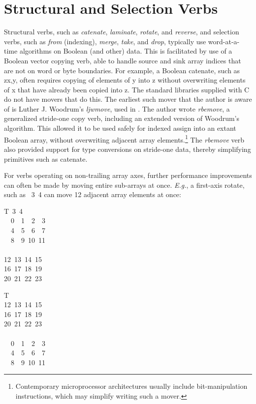 \section{Structural and Selection Verbs}

Structural verbs, such as {\em catenate}, {\em laminate}, 
{\em rotate}, and {\em reverse}, and selection verbs, such as
{\em from} (indexing), {\em merge}, {\em take}, and {\em drop},
typically use word-at-a-time algorithms on Boolean (and other) data.
This is facilitated by use of a Boolean vector copying verb,
able to handle source and sink array indices that are not 
on word or byte boundaries. 
For example, a Boolean catenate, such as {\apl z\qlarrow\0x,y},
often requires copying of elements of {\apl y} into {\apl z} 
without overwriting elements of {\apl x} that have already
been copied into {\apl z}. The standard libraries supplied with C
do not have movers that do this. The earliest such mover
that the author is aware of is Luther J. Woodrum's {\em ljwmove}, 
used in \ibmapl. The author wrote {\em rbemove}, a generalized stride-one
copy verb, including an extended version of 
Woodrum's algorithm. This allowed it to be used safely for
indexed assign into an extant Boolean array, without overwriting
adjacent array elements.\footnote{Contemporary microprocessor architectures 
usually include bit-manipulation instructions, which may simplify 
writing such a mover.} The {\em rbemove} verb also provided
support for type conversions on stride-one data, thereby
simplifying primitives such as catenate.

For verbs operating on non-trailing array axes, further
performance improvements can often be made by moving entire
sub-arrays at once. {\em E.g.}, a first-axis rotate, such as
{\qrotf{}~3~4\qrho\qiota{}} can move 12 
adjacent array elements at once:
\medskip

{\apl T\qlarrow{}~3~4\qrho\qiota{}\\
~~0~~1~~2~~3\\
~~4~~5~~6~~7\\
~~8~~9~10~11\\
~\\
12~13~14~15\\
16~17~18~19\\
20~21~22~23\\}

{\qrotf\0T\\
12~13~14~15\\
16~17~18~19\\
20~21~22~23\\
~\\
~~0~~1~~2~~3\\
~~4~~5~~6~~7\\
~~8~~9~10~11\\}

